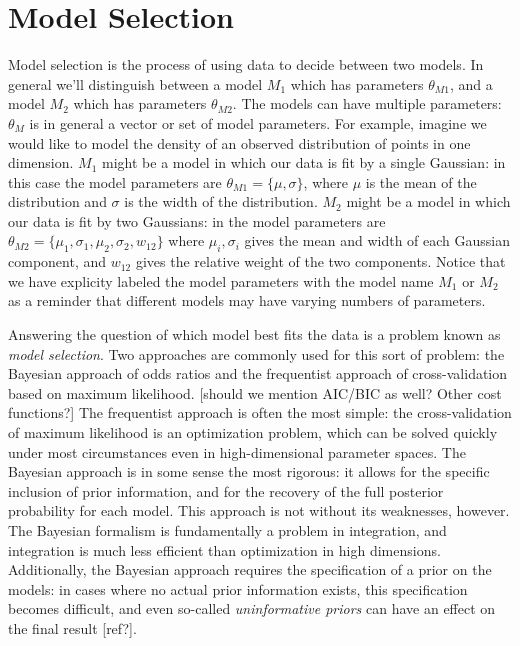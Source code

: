 \documentclass[12pt,pdftex]{article}
\newcommand{\comment}[1]{{\color{red} [#1]}}
\begin{document}
\section{Model Selection}
Model selection is the process of using data to decide between two models.
In general we'll distinguish between a model $M_1$ which has
parameters $\theta_{M1}$, and a model $M_2$ which has parameters $\theta_{M2}$.
The models can have multiple parameters:
$\theta_M$ is in general a vector or set of model parameters.
For example, imagine we would like to model the density of an observed
distribution of points in one dimension.  
$M_1$ might be a model in which our data is fit by a single
Gaussian: in this case the model parameters are $\theta_{M1} = \{\mu, \sigma\}$,
where $\mu$ is the mean of the distribution and $\sigma$ is the width of the
distribution.  $M_2$ might be a model in which our data is fit by two
Gaussians: in the model parameters are
$\theta_{M2} = \{\mu_1,\sigma_1,\mu_2,\sigma_2,w_{12}\}$ where $\mu_i,\sigma_i$
gives the mean and width of each Gaussian component, and $w_{12}$ gives the
relative weight of the two components. Notice that we have explicity
labeled the model parameters with the model name $M_1$ or $M_2$ as a reminder
that different models may have varying numbers of parameters.

Answering the question of which model best fits the data is a problem known
as {\it model selection}.  Two approaches are commonly used for this sort
of problem: the Bayesian approach of odds ratios and the frequentist approach
of cross-validation based on maximum likelihood.
\comment{should we mention AIC/BIC as well? Other cost functions?}
The frequentist approach is often the most simple: the cross-validation of
maximum likelihood is an optimization problem, which can be solved quickly
under most circumstances even in high-dimensional parameter spaces.
The Bayesian approach is in some sense the most rigorous: it allows for the
specific inclusion of prior information, and for the recovery of the full
posterior probability for each model.  This approach is not without its
weaknesses, however.  The Bayesian formalism is fundamentally a problem in
integration, and integration is much less efficient than optimization in
high dimensions.  Additionally, the Bayesian approach requires the
specification of a prior on the models: in cases where no actual prior
information exists, this specification becomes difficult, and even
so-called {\it uninformative priors} can have an effect on the final
result \comment{ref?}.
\end{document}
